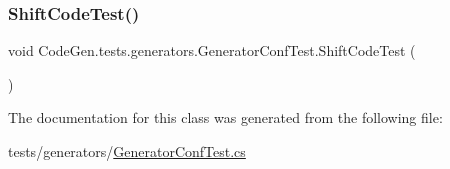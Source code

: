 \mbox{\label{classCodeGen_1_1tests_1_1generators_1_1GeneratorConfTest_a3a26863916eed6ddcc04a59873604f66}} 
\subsubsection{\texorpdfstring{Shift\+Code\+Test()}{ShiftCodeTest()}}
{\footnotesize\ttfamily void Code\+Gen.\+tests.\+generators.\+Generator\+Conf\+Test.\+Shift\+Code\+Test (\begin{DoxyParamCaption}{ }\end{DoxyParamCaption})\hspace{0.3cm}{\ttfamily [inline]}}







The documentation for this class was generated from the following file\+:\begin{DoxyCompactItemize}
\item 
tests/generators/\mbox{\hyperlink{GeneratorConfTest_8cs}{Generator\+Conf\+Test.\+cs}}\end{DoxyCompactItemize}
